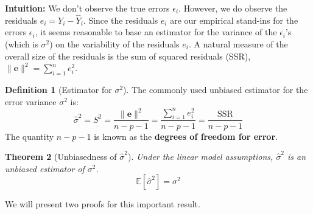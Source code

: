 \documentclass[11pt, letterpaper]{article}
\newtheorem{theorem}{Theorem}[section]
\theoremstyle{definition}
\newtheorem{definition}[theorem]{Definition}
\newcommand{\E}{\mathbb{E}}
\newcommand{\vect}[1]{\boldsymbol{#1}} %
\begin{document}
\textbf{Intuition:} We don't observe the true errors $\epsilon_i$. However, we do observe the residuals $e_i = Y_i - \hat{Y}_i$. Since the residuals $e_i$ are our empirical stand-ins for the errors $\epsilon_i$, it seems reasonable to base an estimator for the variance of the $\epsilon_i$'s (which is $\sigma^2$) on the variability of the residuals $e_i$. A natural measure of the overall size of the residuals is the sum of squared residuals (SSR), $\|\vect{e}\|^2 = \sum_{i=1}^n e_i^2$.

\begin{definition}[Estimator for $\sigma^2$]
The commonly used unbiased estimator for the error variance $\sigma^2$ is:
\[
\hat{\sigma}^2 = S^2 = \frac{\|\vect{e}\|^2}{n - p - 1} = \frac{\sum_{i=1}^n e_i^2}{n - p - 1} = \frac{\text{SSR}}{n - p - 1}
\]
The quantity $n-p-1$ is known as the \textbf{degrees of freedom for error}.
\end{definition}

\begin{theorem}[Unbiasedness of $\hat{\sigma}^2$]
Under the linear model assumptions, $\hat{\sigma}^2$ is an unbiased estimator of $\sigma^2$.
\[
\E[\hat{\sigma}^2] = \sigma^2
\]
\end{theorem}

We will present two proofs for this important result.
\end{document}

